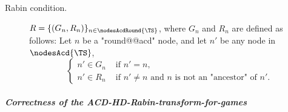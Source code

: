 \documentclass{theoretics}
\begin{document}
\begin{definition}
\begin{description}
 		\item[Rabin condition.] $R = \{(G_n, R_n)\}_{n\in \nodesAcdRound{\TS}}$, where $G_n$ and $R_n$ are defined as follows: Let $n$ be a "round@@acd" node, and let $n'$ be any node in $\nodesAcd{\TS}$,
 		\begin{equation*}
 			\begin{cases}
 				n' \in G_n & \text{ if } n'=n,\\
 				n' \in R_n & \text{ if }  n'\neq n \text{ and } n \text{ is not an "ancestor" of } n'. 
 			\end{cases}
 		\end{equation*} 	
 	
 	\end{description}
 \end{definition}


\subparagraph*{Correctness of the ACD-HD-Rabin-transform-for-games}
\correctnessAcdRabinTransformGames*
 
\end{document}
